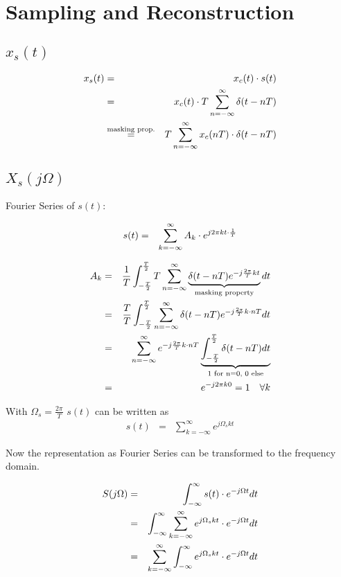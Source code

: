 \section{Sampling and Reconstruction} 

\subsection{$x_s(t)$}

\begin{eqnarray*}
x_s(t) & = & x_c(t) \cdot s(t) \\
       & = & x_c(t) \cdot T \sum_{n=-\infty}^{\infty} \delta (t-nT) \\
       & \overset{\text{masking prop.}}{=}  & T \sum_{n=-\infty}^{\infty} x_c(nT) \cdot \delta (t-nT)
\end{eqnarray*}


\subsection{$X_s(j\Omega)$}

Fourier Series of $s(t)$:

\begin{eqnarray*}
s(t) & = & \sum_{k=-\infty}^{\infty} A_k \cdot e^{j2\pi k t \cdot \frac{1}{T}}
\end{eqnarray*}

\begin{eqnarray*}
A_k & = & \frac{1}{T} \int_{-\frac{T}{2}}^{\frac{T}{2}} T \sum_{n=-\infty}^{\infty} \underbrace{\delta (t-nT) e^{-j \frac{2\pi}{T}kt}}_{\text{masking property}}  dt \\
& = & \frac{T}{T} \int_{-\frac{T}{2}}^{\frac{T}{2}} \sum_{n=-\infty}^{\infty} \delta (t-nT) e^{-j \frac{2\pi}{T}k\cdot nT} dt \\
& = & \sum_{n=-\infty}^{\infty}  e^{-j \frac{2\pi}{T}k\cdot nT} \underbrace{\int_{-\frac{T}{2}}^{\frac{T}{2}}  \delta (t-nT) dt}_{\text{1 for n=0, 0 else}} \\
& = & e^{-j 2 \pi k 0 } = 1 \quad \forall k
\end{eqnarray*}

With $\Omega_s = \frac{2\pi}{T}$ $s(t)$ can be written as
\begin{eqnarray*}
s(t) & = & \sum_{k=-\infty}^{\infty} e^{j \Omega_s k t}
\end{eqnarray*}

Now the representation as Fourier Series can be transformed to the frequency domain.

\begin{eqnarray*}
S(j\Omega) & = & \int_{-\infty}^{\infty} s(t) \cdot e^{-j \Omega t} dt \\
 & = & \int_{-\infty}^{\infty} \sum_{k=-\infty}^{\infty} e^{j \Omega_s k t} \cdot e^{-j \Omega t} dt \\
 & = & \sum_{k=-\infty}^{\infty}  \int_{-\infty}^{\infty} e^{j \Omega_s k t} \cdot e^{-j \Omega t} dt 
\end{eqnarray*}

